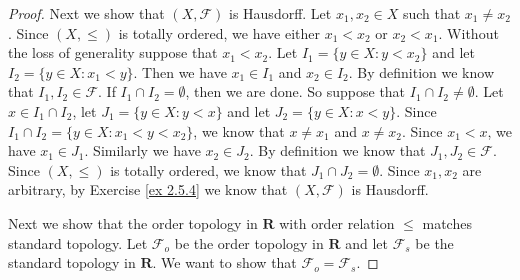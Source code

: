 \begin{proof}
    Next we show that \((X, \mathcal{F})\) is Hausdorff.
    Let \(x_1, x_2 \in X\) such that \(x_1 \neq x_2\).
    Since \((X, \leq)\) is totally ordered, we have either \(x_1 < x_2\) or \(x_2 < x_1\).
    Without the loss of generality suppose that \(x_1 < x_2\).
    Let \(I_1 = \{y \in X : y < x_2\}\) and let \(I_2 = \{y \in X : x_1 < y\}\).
    Then we have \(x_1 \in I_1\) and \(x_2 \in I_2\).
    By definition we know that \(I_1, I_2 \in \mathcal{F}\).
    If \(I_1 \cap I_2 = \emptyset\), then we are done.
    So suppose that \(I_1 \cap I_2 \neq \emptyset\).
    Let \(x \in I_1 \cap I_2\), let \(J_1 = \{y \in X : y < x\}\) and let \(J_2 = \{y \in X : x < y\}\).
    Since \(I_1 \cap I_2 = \{y \in X : x_1 < y < x_2\}\), we know that \(x \neq x_1\) and \(x \neq x_2\).
    Since \(x_1 < x\), we have \(x_1 \in J_1\).
    Similarly we have \(x_2 \in J_2\).
    By definition we know that \(J_1, J_2 \in \mathcal{F}\).
    Since \((X, \leq)\) is totally ordered, we know that \(J_1 \cap J_2 = \emptyset\).
    Since \(x_1, x_2\) are arbitrary, by Exercise \ref{ex 2.5.4} we know that \((X, \mathcal{F})\) is Hausdorff.

    Next we show that the order topology in \(\mathbf{R}\) with order relation \(\leq\) matches standard topology.
    Let \(\mathcal{F}_o\) be the order topology in \(\mathbf{R}\) and let \(\mathcal{F}_s\) be the standard topology in \(\mathbf{R}\).
    We want to show that \(\mathcal{F}_o = \mathcal{F}_s\).


\end{proof}
